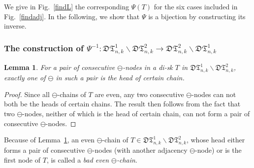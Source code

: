 \documentclass[12pt]{amsart}
\numberwithin{equation}{section}
\theoremstyle{plain}
\newtheorem{lemma}[theorem]{Lemma}
\theoremstyle{definition}
\def\D{\mathfrak{D}}
\def\T{\mathfrak{T}}
\begin{document}
We give in Fig.~\ref{findL} the corresponding $\Psi(T)$ for the six cases included in Fig.~\ref{findadj}. In the following, we show that $\Psi$ is a bijection by constructing its inverse. 


\subsubsection{The construction of $\Psi^{-1}:\D\T^{1}_{n,k}\backslash \D\T^{2}_{n,k}\rightarrow\D\T^{2}_{n,k}\backslash \D\T^{1}_{n,k}$}


\begin{lemma}\label{head}
For a pair of consecutive $\ominus$-nodes in a di-sk $T$ in $\D\T^{1}_{n,k}\backslash \D\T^{2}_{n,k}$, exactly one of $\ominus$ in such a pair is the head of certain chain.
\end{lemma}
\begin{proof}
Since all $\ominus$-chains of $T$ are even, any two consecutive $\ominus$-nodes can not both be the heads of certain chains. The result then follows from the fact that two $\ominus$-nodes, neither of which is the head of certain chain, can not form a pair of consecutive  $\ominus$-nodes.
\end{proof}

Because of Lemma~\ref{head}, an even $\ominus$-chain of  $T\in\D\T^{1}_{n,k}\backslash \D\T^{2}_{n,k}$, whose head either forms a pair of consecutive $\ominus$-nodes (with another adjacency $\ominus$-node) or is  the first node of $T$,  is called a {\em bad even $\ominus$-chain}. 
\end{document}
